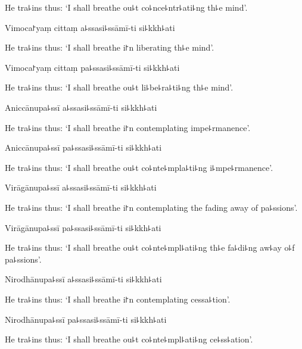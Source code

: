 \begin{english}
  He tra꜕ins thus: `I shall breathe ou꜕t co꜕nce꜕ntr꜕ati꜕ng th꜕e mind'.
\end{english}

Vimoca꜓yaṃ cittaṃ a꜕ssasi꜕ssāmī-ti si꜕kkh꜕ati

\begin{english}
  He tra꜕ins thus: `I shall breathe i꜓n liberating th꜕e mind'.
\end{english}

Vimoca꜓yaṃ cittaṃ pa꜕ssasi꜕ssāmī-ti si꜕kkh꜕ati

\begin{english}
  He tra꜕ins thus: `I shall breathe ou꜕t li꜕be꜕ra꜕ti꜕ng th꜕e mind'.
\end{english}

Aniccānupa꜕ssī a꜕ssasi꜕ssāmī-ti si꜕kkh꜕ati

\begin{english}
  He tra꜕ins thus: `I shall breathe i꜓n contemplating impe꜕rmanence'.
\end{english}

Aniccānupa꜕ssī pa꜕ssasi꜕ssāmī-ti si꜕kkh꜕ati

\begin{english}
  He tra꜕ins thus: `I shall breathe ou꜕t co꜕nte꜕mpla꜕ti꜕ng i꜕mpe꜕rmanence'.
\end{english}

Virāgānupa꜕ssī a꜕ssasi꜕ssāmī-ti si꜕kkh꜕ati

\begin{english}
  He tra꜕ins thus: `I shall breathe i꜓n contemplating the fading away of pa꜕ssions'.
\end{english}

Virāgānupa꜕ssī pa꜕ssasi꜕ssāmī-ti si꜕kkh꜕ati

\begin{english}
  He tra꜕ins thus: `I shall breathe ou꜕t co꜕nte꜕mpl꜕ati꜕ng th꜕e fa꜕di꜕ng aw꜕ay o꜕f pa꜕ssions'.
\end{english}

Nirodhānupa꜕ssī a꜕ssasi꜕ssāmī-ti si꜕kkh꜕ati

\begin{english}
  He tra꜕ins thus: `I shall breathe i꜓n contemplating cessa꜕tion'.
\end{english}

Nirodhānupa꜕ssī pa꜕ssasi꜕ssāmī-ti si꜕kkh꜕ati

\begin{english}
  He tra꜕ins thus: `I shall breathe ou꜕t co꜕nte꜕mpl꜕ati꜕ng ce꜕ss꜕ation'.
\end{english}

